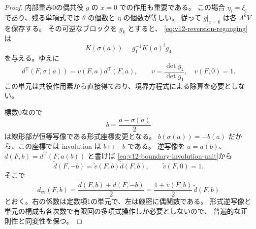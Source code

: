\documentclass[a4paper,11pt]{ltjsarticle}
\theoremstyle{definition}
\begin{document}
\begin{proof}
内部重み0の偶共役 $g$ の $x=0$ での作用も重要である。
この場合 $\eta_i=\xi_i$ であり、残る単項式では
$\theta$ の個数と $\eta$ の個数が等しい。
従って $g|_{x=0}$ は各 $\Lambda^kV$ を保存する。
その可逆なブロックを $g_k$ とすると、
\eqref{eq:v12-reversion-regauging}は
\[
 K(\sigma(a))=g_1^{-1}K(a)^t g_4
\]
を与える。ゆえに
\begin{equation}\label{eq:v12-boundary-involution-unit}
 d^{\mathrm T}(F,\sigma(a))
 =v(F,a)d^{\mathrm T}(F,a),\qquad
 v=\frac{\det g_4}{\det g_1},\quad v(F,0)=1.
\end{equation}
この単元は共役作用素から直接得ており、境界方程式による除算を必要としない。

標数0なので
\[
 b=\frac{a-\sigma(a)}2
\]
は線形部が恒等写像である形式座標変更となる。
$b(\sigma(a))=-b(a)$ だから、この座標では involution は $b\mapsto-b$ である。
逆写像を $a=a(b)$、$\widetilde d(F,b)=d^{\mathrm T}(F,a(b))$ と書けば
\eqref{eq:v12-boundary-involution-unit}から
\[
 \widetilde d(F,-b)=\widetilde v(F,b)\widetilde d(F,b),\qquad
 \widetilde v(F,0)=1.
\]
そこで
\begin{equation}\label{eq:v12-even-average}
 d_{\mathrm{ev}}(F,b)
 =\frac{\widetilde d(F,b)+\widetilde d(F,-b)}2
 =\frac{1+\widetilde v(F,b)}2\,\widetilde d(F,b)
\end{equation}
とおく。右の係数は定数項1の単元で、左は厳密に偶関数である。
形式逆写像と単元の構成も各次数で有限回の多項式操作しか必要としないので、
普遍的な正則性と同変性を保つ。
\end{proof}
\end{document}
